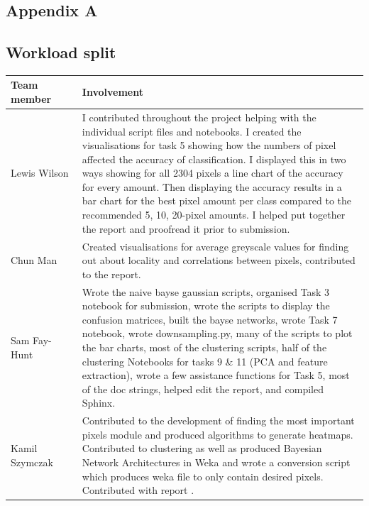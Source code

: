\documentclass[11pt]{article}
\begin{document}
\pagebreak
\appendix
\appendixpage
\addappheadtotoc
\begin{appendices}
\section{Appendix A}


\subsection{Workload split}
  
  \begin{table}[ht]
    \centering
    \begin{tabular}{|p{0.2\linewidth} | p{0.8\linewidth}|} 
      \hline
      \textbf{Team member}  & \textbf{Involvement} \\ \hline
      Lewis Wilson & I contributed throughout the project helping with the individual script files and notebooks. I created the visualisations for task 5 showing how the numbers of pixel affected the accuracy of classification. I displayed this in two ways showing for all 2304 pixels a line chart of the accuracy for every amount. Then displaying the accuracy results in a bar chart for the best pixel amount per class compared to the recommended 5, 10, 20-pixel amounts. I helped put together the report and proofread it prior to submission. \\ \hline
      Chun Man & Created visualisations for average greyscale values for finding out about locality and correlations between pixels, contributed to the report.  \\ \hline
      Sam Fay-Hunt & Wrote the naive bayse gaussian scripts, organised Task 3 notebook for submission, wrote the scripts to display the confusion matrices, built the bayse networks, wrote Task 7 notebook, wrote downsampling.py, many of the scripts to plot the bar charts, most of the clustering scripts, half of the clustering Notebooks for tasks 9 \& 11 (PCA and feature extraction), wrote a few assistance functions for Task 5, most of the doc strings, helped edit the report, and compiled Sphinx. \\ \hline
      Kamil Szymczak & Contributed to the development of finding the most important pixels module and produced algorithms to generate heatmaps. Contributed to clustering as well as produced Bayesian Network Architectures in Weka and wrote a conversion script which produces weka file to only contain desired pixels. Contributed with report . \\ \hline
    \end{tabular}
  \end{table}\label{ContributionTab}


\end{appendices}
\end{document}
